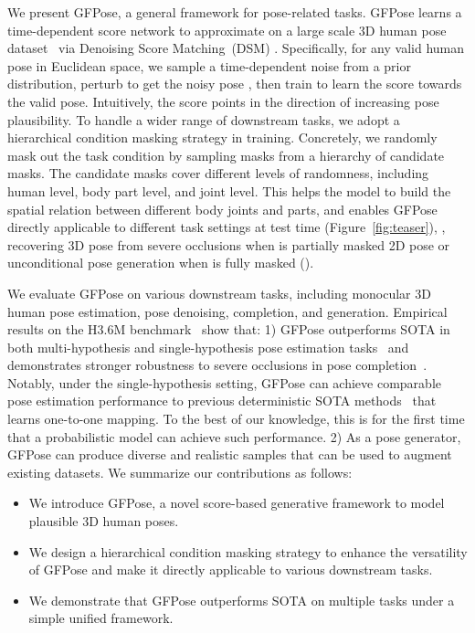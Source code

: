 \documentclass[10pt,twocolumn,letterpaper]{article}
\begin{document}
We present GFPose, a general framework for pose-related tasks. GFPose learns a time-dependent score network  to approximate  on a large scale 3D human pose dataset~\cite{h36m_pami} via Denoising Score Matching~(DSM) \cite{denosingScoreMatching, hyvarinen2005estimation, song2020sliced, song2019generative, song2020improved, song2020score, song2021maximum}. 
Specifically, for any valid human pose  in Euclidean space, we sample a time-dependent noise  from a prior distribution, perturb  to get the noisy pose , then train  to learn the score towards the valid pose. Intuitively, the score points in the direction of increasing pose plausibility. 
To handle a wider range of downstream tasks, we adopt a hierarchical condition masking strategy in training. Concretely, we randomly mask out the task condition  by sampling masks from a hierarchy of candidate masks. The candidate masks cover different levels of randomness, including human level, body part level, and joint level. This helps the model to build the spatial relation between different body joints and parts, and enables GFPose directly applicable to different task settings at test time (Figure~\ref{fig:teaser}), \eg, recovering 3D pose from severe occlusions when  is partially masked 2D pose or unconditional pose generation when  is fully masked ().













We evaluate GFPose on various downstream tasks, including monocular 3D human pose estimation, pose denoising, completion, and generation. Empirical results on the H3.6M benchmark~\cite{h36m_pami} show that: 
1) GFPose outperforms SOTA in both multi-hypothesis and single-hypothesis pose estimation tasks~\cite{wehrbein2021probabilistic} and demonstrates stronger robustness to severe occlusions in pose completion~\cite{Li_2019_CVPR}. Notably, under the single-hypothesis setting, GFPose can achieve comparable pose estimation performance to previous deterministic SOTA methods~\cite{zeng2020srnet, ci2019optimizing, pavllo20193d} that learns one-to-one mapping. To the best of our knowledge, this is for the first time that a probabilistic model can achieve such performance. 2) As a pose generator, GFPose can produce diverse and realistic samples that can be used to augment existing datasets.
We summarize our contributions as follows:
\begin{itemize}
    \setlength\itemsep{-0.25em}
\item We introduce GFPose, a novel score-based generative framework to model plausible 3D human poses.
    \item We design a hierarchical condition masking strategy to enhance the versatility of GFPose and make it directly applicable to various downstream tasks.
\item We demonstrate that GFPose outperforms SOTA on multiple tasks under a simple unified framework.
\end{itemize}
\end{document}
